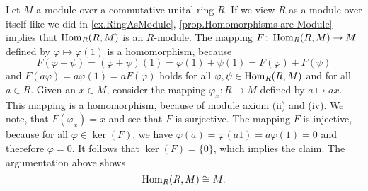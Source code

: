 \begin{rem}
Let $M$ a module over a commutative unital ring $R$. If we view $R$ as a module over itself like we did in \cref{ex.RingAsModule}, \cref{prop.Homomorphisms are Module} implies that $\operatorname{\mathrm{Hom}}_R(R,M)$ is an $R$-module. The mapping $F\colon\operatorname{\mathrm{Hom}}_R(R,M)\to M$ defined by $\varphi\mapsto\varphi(1)$ is a homomorphism, because 
\begin{equation*}
F(\varphi+\psi)=(\varphi+\psi)(1)=\varphi(1)+\psi(1)=F(\varphi)+F(\psi)
\end{equation*}
and $F(a\varphi)=a\varphi(1)=aF(\varphi)$ holds for all $\varphi,\psi\in\operatorname{\mathrm{Hom}}_R(R,M)$ and for all $a\in R$. Given an $x\in M$, consider the mapping $\varphi_x\colon R\to M$ defined by $a\mapsto ax$. This mapping is a homomorphism, because of module axiom (ii) and (iv). We note, that $F(\varphi_x)=x$ and see that $F$ is surjective. The mapping $F$ is injective, because for all $\varphi\in\ker(F)$, we have $\varphi(a)=\varphi(a1)=a\varphi(1)=0$ and therefore $\varphi=0$. It follows that $\ker(F)=\lbrace 0\rbrace$, which implies the claim. The argumentation above shows
\begin{equation*}
\operatorname{\mathrm{Hom}}_R(R,M)\cong M.
\end{equation*}
\end{rem}
